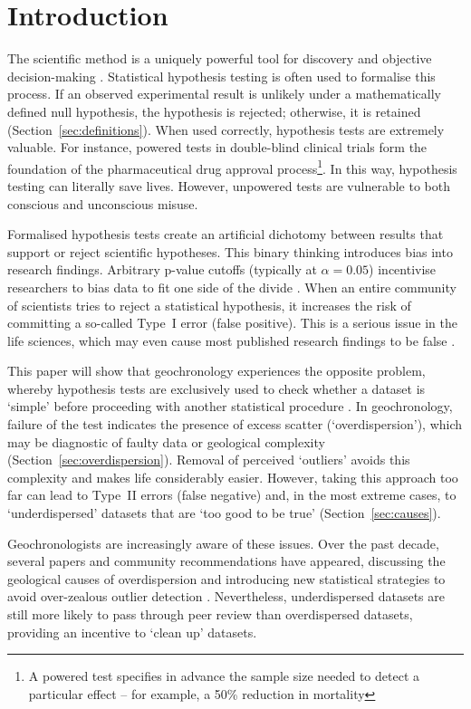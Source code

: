 \documentclass{article}
\begin{document}
\section{Introduction}\label{sec:intro}

The scientific method is a uniquely powerful tool for discovery and
objective decision-making \citep{popper1959}. Statistical hypothesis
testing is often used to formalise this process. If an observed
experimental result is unlikely under a mathematically defined null
hypothesis, the hypothesis is rejected; otherwise, it is retained
(Section~\ref{sec:definitions}).  When used correctly, hypothesis
tests are extremely valuable. For instance, powered tests in
double-blind clinical trials form the foundation of the pharmaceutical
drug approval process\footnote{A powered test specifies in advance the
sample size needed to detect a particular effect -- for example, a
50\% reduction in mortality}.  In this way, hypothesis testing can
literally save lives. However, unpowered tests are vulnerable to both
conscious and unconscious misuse.\medskip

Formalised hypothesis tests create an artificial dichotomy between
results that support or reject scientific hypotheses. This binary
thinking introduces bias into research findings. Arbitrary p-value
cutoffs (typically at $\alpha = 0.05$) incentivise researchers to bias
data to fit one side of the divide \citep{amrhein2019}. When an entire
community of scientists tries to reject a statistical hypothesis, it
increases the risk of committing a so-called Type~I error (false
positive). This is a serious issue in the life sciences, which may
even cause most published research findings to be false
\citep{ioannidis2005}.\medskip

This paper will show that geochronology experiences the opposite
problem, whereby hypothesis tests are exclusively used to check
whether a dataset is `simple' before proceeding with another
statistical procedure \citep{mcintyre1966}. In geochronology, failure
of the test indicates the presence of excess scatter
(`overdispersion'), which may be diagnostic of faulty data or
geological complexity (Section~\ref{sec:overdispersion}).  Removal of
perceived `outliers' avoids this complexity and makes life
considerably easier. However, taking this approach too far can lead to
Type~II errors (false negative) and, in the most extreme cases, to
`underdispersed' datasets that are `too good to be true'
(Section~\ref{sec:causes}).\medskip

Geochronologists are increasingly aware of these issues. Over the past
decade, several papers and community recommendations have appeared,
discussing the geological causes of overdispersion and introducing new
statistical strategies to avoid over-zealous outlier detection
\citep[e.g.,][]{horstwood2016,keller2018,klein2024,vermeesch2025c}.
Nevertheless, underdispersed datasets are still more likely to pass
through peer review than overdispersed datasets, providing an
incentive to `clean up' datasets.\medskip
\end{document}
